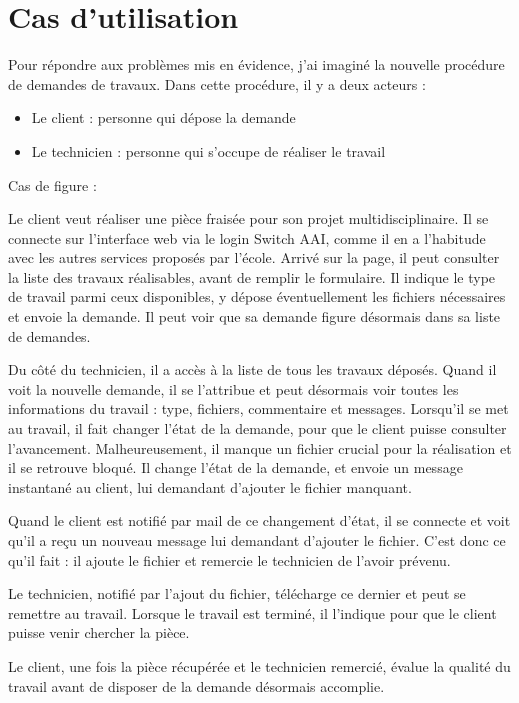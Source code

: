 \documentclass[
    iai, %
    eai, %
]{heig-tb}
\begin{document}
\section{Cas d'utilisation}
Pour répondre aux problèmes mis en évidence, j'ai imaginé la nouvelle procédure de demandes de travaux. Dans cette procédure, il y a deux acteurs :

\begin{itemize}
  \item Le client : personne qui dépose la demande
  \item Le technicien : personne qui s'occupe de réaliser le travail
\end{itemize}

Cas de figure :

Le client veut réaliser une pièce fraisée pour son projet multidisciplinaire. Il se connecte sur l'interface web via le login Switch AAI, comme il en a l'habitude avec les autres services proposés par l'école. Arrivé sur la page, il peut consulter la liste des travaux réalisables, avant de remplir le formulaire. Il indique le type de travail parmi ceux disponibles, y dépose éventuellement les fichiers nécessaires et envoie la demande. Il peut voir que sa demande figure désormais dans sa liste de demandes.

Du côté du technicien, il a accès à la liste de tous les travaux déposés. Quand il voit la nouvelle demande, il se l'attribue et peut désormais voir toutes les informations du travail : type, fichiers, commentaire et messages. Lorsqu'il se met au travail, il fait changer l'état de la demande, pour que le client puisse consulter l'avancement. 
Malheureusement, il manque un fichier crucial pour la réalisation et il se retrouve bloqué. Il change l'état de la demande, et envoie un message instantané au client, lui demandant d'ajouter le fichier manquant.

Quand le client est notifié par mail de ce changement d'état, il se connecte et voit qu'il a reçu un nouveau message lui demandant d'ajouter le fichier. C'est donc ce qu'il fait : il ajoute le fichier et remercie le technicien de l'avoir prévenu.

Le technicien, notifié par l'ajout du fichier, télécharge ce dernier et peut se remettre au travail. Lorsque le travail est terminé, il l'indique pour que le client puisse venir chercher la pièce.

Le client, une fois la pièce récupérée et le technicien remercié, évalue la qualité du travail avant de disposer de la demande désormais accomplie.
\end{document}
